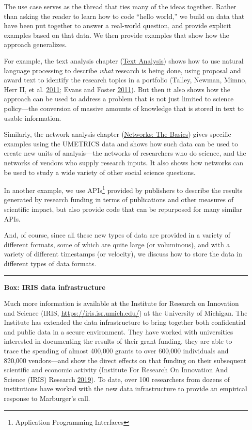 \documentclass[]{krantz}
\begin{document}
The use case serves as the thread that ties many of the ideas together.
Rather than asking the reader to learn how to code ``hello world,'' we
build on data that have been put together to answer a real-world
question, and provide explicit examples based on that data. We then
provide examples that show how the approach generalizes.

For example, the text analysis chapter
(\protect\hyperlink{chap:text}{Text Analysis}) shows how to use natural
language processing to describe \emph{what} research is being done,
using proposal and award text to identify the research topics in a
portfolio (Talley, Newman, Mimno, Herr II, et al.
\protect\hyperlink{ref-talley2011database}{2011}; Evans and Foster
\protect\hyperlink{ref-Evans2011}{2011}). But then it also shows how the
approach can be used to address a problem that is not just limited to
science policy---the conversion of massive amounts of knowledge that is
stored in text to usable information.

Similarly, the network analysis chapter
(\protect\hyperlink{chap:networks}{Networks: The Basics}) gives specific
examples using the UMETRICS data and shows how such data can be used to
create new units of analysis---the networks of researchers who do
science, and the networks of vendors who supply research inputs. It also
shows how networks can be used to study a wide variety of other social
science questions.

In another example, we use APIs\footnote{Application Programming
  Interfaces} provided by publishers to describe the results generated
by research funding in terms of publications and other measures of
scientific impact, but also provide code that can be repurposed for many
similar APIs.

And, of course, since all these new types of data are provided in a
variety of different formats, some of which are quite large (or
voluminous), and with a variety of different timestamps (or velocity),
we discuss how to store the data in different types of data formats.

\begin{center}\rule{0.5\linewidth}{\linethickness}\end{center}

\textbf{Box: IRIS data infrastructure}

Much more information is available at the Institute for Research on
Innovation and Science (IRIS, \url{https://iris.isr.umich.edu/}) at the
University of Michigan. The Institute has extended the data
infrastructure to bring together both confidential and public data in a
secure environment. They have worked with universities interested in
documenting the results of their grant funding, they are able to trace
the spending of almost 400,000 grants to over 600,000 individuals and
820,000 vendors---and show the direct effects on that funding on their
subsequent scientific and economic activity (Institute For Research On
Innovation And Science (IRIS) Research
\protect\hyperlink{ref-InstituteForResearchOnInnovationAndScienceIRISResearch2019}{2019}).
To date, over 100 researchers from dozens of institutions have worked
with the new data infrastructure to provide an empirical response to
Marburger's call.
\end{document}
